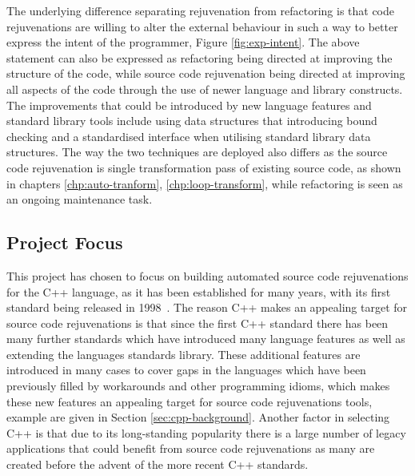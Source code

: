 \documentclass[bsc,frontabs,singlespacing,twoside,parskip,deptreport]{infthesis}
\begin{document}
The underlying difference separating rejuvenation from refactoring is that code rejuvenations are willing to alter the external behaviour in such a way to better express the intent of the programmer, Figure \ref{fig:exp-intent}. The above statement can also be expressed as refactoring being directed at improving the structure of the code, while source code rejuvenation being directed at improving all aspects of the code through the use of newer language and library constructs. The improvements that could be introduced by new language features and standard library tools include using data structures that introducing bound checking and a standardised interface when utilising standard library data structures. The way the two techniques are deployed also differs as the source code rejuvenation is single transformation pass of existing source code, as shown in chapters \ref{chp:auto-tranform}, \ref{chp:loop-transform}, while refactoring is seen as an ongoing maintenance task.

\subsection{Project Focus}

This project has chosen to focus on building automated source code rejuvenations for the C++ language, as it has been established for many years, with its first standard being released in 1998~\cite{ISO:1998:IIP}. The reason C++ makes an appealing target for source code rejuvenations is that since the first C++ standard there has been many further standards which have introduced many language features as well as extending the languages standards library. These additional features are introduced in many cases to cover gaps in the languages which have been previously filled by workarounds and other programming idioms, which makes these new features an appealing target for source code rejuvenations tools, example are given in Section \ref{sec:cpp-background}. Another factor in selecting C++ is that due to its long-standing popularity there is a large number of legacy applications that could benefit from source code rejuvenations as many are created before the advent of the more recent C++ standards. 

% 

\end{document}

